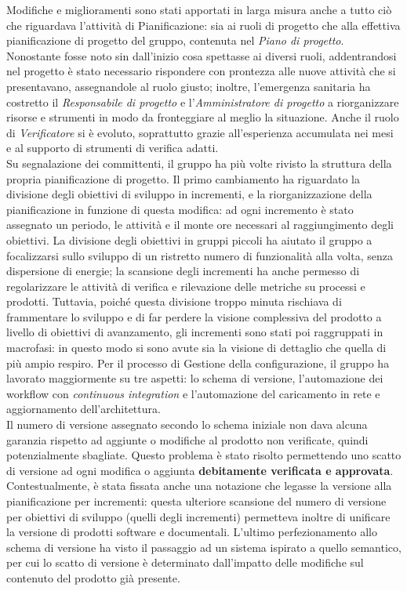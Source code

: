 	\newline
	Modifiche e miglioramenti sono stati apportati in larga misura anche a tutto ciò che riguardava l'attività di Pianificazione: sia ai ruoli di progetto che alla effettiva pianificazione di progetto del gruppo, contenuta nel \textit{Piano di progetto}.
	\\Nonostante fosse noto sin dall'inizio cosa spettasse ai diversi ruoli, addentrandosi nel progetto è stato necessario rispondere con prontezza alle nuove attività che si presentavano, assegnandole al ruolo giusto; inoltre, l'emergenza sanitaria ha costretto il \textit{Responsabile di progetto} e l'\textit{Amministratore di progetto} a riorganizzare risorse e strumenti in modo da fronteggiare al meglio la situazione. Anche il ruolo di \textit{Verificatore} si è evoluto, soprattutto grazie all'esperienza accumulata nei mesi e al supporto di strumenti di verifica adatti.
	\\Su segnalazione dei committenti, il gruppo ha più volte rivisto la struttura della propria pianificazione di progetto. Il primo cambiamento ha riguardato la divisione degli obiettivi di sviluppo in incrementi, e la riorganizzazione della pianificazione in funzione di questa modifica: ad ogni incremento è stato assegnato un periodo, le attività e il monte ore necessari al raggiungimento degli obiettivi. La divisione degli obiettivi in gruppi piccoli ha aiutato il gruppo a focalizzarsi sullo sviluppo di un ristretto numero di funzionalità alla volta, senza dispersione di energie; la scansione degli incrementi ha anche permesso di regolarizzare le attività di verifica e rilevazione delle metriche su processi e prodotti. Tuttavia, poiché questa divisione troppo minuta rischiava di frammentare lo sviluppo e di far perdere la visione complessiva del prodotto a livello di obiettivi di avanzamento, gli incrementi sono stati poi raggruppati in macrofasi: in questo modo si sono avute sia la visione di dettaglio che quella di più ampio respiro.
	\newline
	Per il processo di Gestione della  configurazione, il gruppo ha lavorato maggiormente su tre aspetti: lo schema di versione, l'automazione dei workflow con \textit{continuous integration} e l'automazione del caricamento in rete e aggiornamento dell'architettura.
	\\Il numero di versione assegnato secondo lo schema iniziale non dava alcuna garanzia rispetto ad aggiunte o modifiche al prodotto non verificate, quindi potenzialmente sbagliate. Questo problema è stato risolto permettendo uno scatto di versione ad ogni modifica o aggiunta \textbf{debitamente verificata e approvata}. Contestualmente, è stata fissata anche una notazione che legasse la versione alla pianificazione per incrementi: questa ulteriore scansione del numero di versione per obiettivi di sviluppo (quelli degli incrementi) permetteva inoltre di unificare la versione di prodotti software e documentali. L'ultimo perfezionamento allo schema di versione ha visto il passaggio ad un sistema ispirato a quello semantico, per cui lo scatto di versione è determinato dall'impatto delle modifiche sul contenuto del prodotto già presente.

